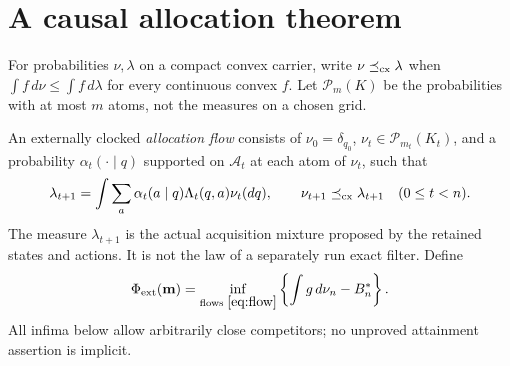 \section{A causal allocation theorem}\label{sec:completion}
For probabilities $\nu,\lambda$ on a compact convex carrier, write $\nu\preceq_{\rm cx}\lambda$ when
$\int f\,d\nu\le\int f\,d\lambda$ for every continuous convex $f$. Let $\mathcal P_m(K)$ be the probabilities with at most $m$ atoms, not the measures on a chosen grid.

An externally clocked \emph{allocation flow} consists of $\nu_0=\delta_{q_0}$,
$\nu_t\in\mathcal P_{m_t}(K_t)$, and a probability $\alpha_t(\cdot\mid q)$ supported on $\mathcal A_t$ at each atom of $\nu_t$, such that
\begin{equation}\label{eq:flow}
 \lambda_{t+1}=\int\sum_a\alpha_t(a\mid q)\Lambda_t(q,a)\nu_t(dq),
 \qquad \nu_{t+1}\preceq_{\rm cx}\lambda_{t+1}\quad(0\le t<n).
\end{equation}
The measure $\lambda_{t+1}$ is the actual acquisition mixture proposed by the retained states and actions. It is not the law of a separately run exact filter. Define
\begin{equation}\label{eq:phi}
 \Phi_{\mathrm{ext}}(\mathbf m)=\inf_{\text{flows }\eqref{eq:flow}}
 \left\{\int g\,d\nu_n-B_n^*\right\}.
\end{equation}
All infima below allow arbitrarily close competitors; no unproved attainment assertion is implicit.

